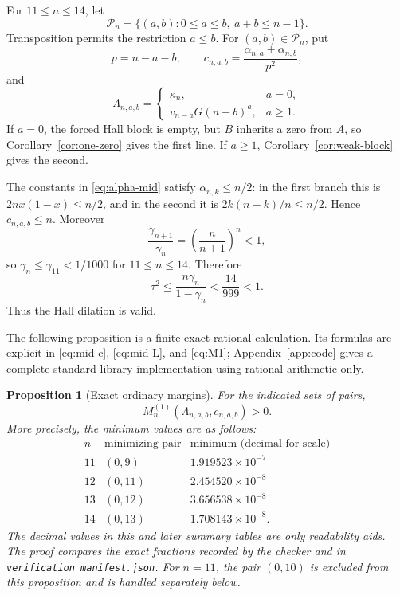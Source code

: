\documentclass[11pt,a4paper]{article}
\numberwithin{equation}{section}
\newtheorem{proposition}[theorem]{Proposition}
\theoremstyle{definition}
\newcommand{\1}{\mathbf{1}}
\begin{document}
For $11\le n\le14$, let
\[
 \mathcal P_n=
 \{(a,b):0\le a\le b,\ a+b\le n-1\}.
\]
Transposition permits the restriction $a\le b$.  For $(a,b)\in\mathcal P_n$, put
\begin{equation}\label{eq:mid-c}
 p=n-a-b,
 \qquad
 c_{n,a,b}=
 \frac{\alpha_{n,a}+\alpha_{n,b}}{p^2},
\end{equation}
and
\begin{equation}\label{eq:mid-L}
 \Lambda_{n,a,b}=
 \begin{cases}
  \kappa_n,&a=0,\\[1mm]
  v_{n-a}G(n-b)^a,&a\ge1.
 \end{cases}
\end{equation}
If $a=0$, the forced Hall block is empty, but $B$ inherits a zero from $A$, so Corollary~\ref{cor:one-zero} gives the first line.  If $a\ge1$, Corollary~\ref{cor:weak-block} gives the second.

The constants in \eqref{eq:alpha-mid} satisfy $\alpha_{n,k}\le n/2$: in the first branch this is $2n x(1-x)\le n/2$, and in the second it is $2k(n-k)/n\le n/2$.  Hence $c_{n,a,b}\le n$.  Moreover
\[
 \frac{\gamma_{n+1}}{\gamma_n}=\left(\frac{n}{n+1}\right)^n<1,
\]
so $\gamma_n\le\gamma_{11}<1/1000$ for $11\le n\le14$.  Therefore
\[
 \tau^2\le\frac{n\gamma_n}{1-\gamma_n}
 <\frac{14}{999}<1.
\]
Thus the Hall dilation is valid.

The following proposition is a finite exact-rational calculation.  Its formulas are explicit in \eqref{eq:mid-c}, \eqref{eq:mid-L}, and \eqref{eq:M1}; Appendix~\ref{app:code} gives a complete standard-library implementation using rational arithmetic only.

\begin{proposition}[Exact ordinary margins]\label{prop:mid-margins}
For the indicated sets of pairs,
\[
 M_n^{(1)}(\Lambda_{n,a,b},c_{n,a,b})>0.
\]
More precisely, the minimum values are as follows:
\begin{equation}\label{eq:mid-margin-table}
\begin{array}{c|c|c}
 n&\text{minimizing pair}&\text{minimum (decimal for scale)}\\ \hline
 11&(0,9)&1.919523\times10^{-7}\\
 12&(0,11)&2.454520\times10^{-8}\\
 13&(0,12)&3.656538\times10^{-8}\\
 14&(0,13)&1.708143\times10^{-8}.
\end{array}
\end{equation}
The decimal values in this and later summary tables are only readability
aids.  The proof compares the exact fractions recorded by the checker and in
\texttt{verification\_manifest.json}.
For $n=11$, the pair $(0,10)$ is excluded from this proposition and is handled separately below.
\end{proposition}
\end{document}
